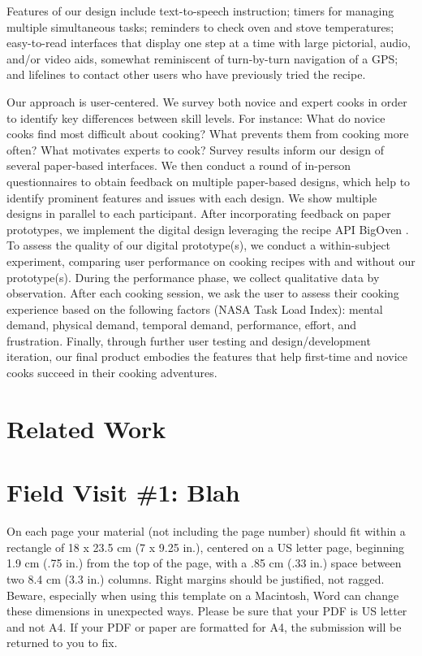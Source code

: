 \documentclass{sigchi}
\begin{document}
Features of our design include text-to-speech instruction; timers for managing multiple simultaneous tasks; reminders to check oven and stove temperatures; easy-to-read interfaces that display one step at a time with large pictorial, audio, and/or video aids, somewhat reminiscent of turn-by-turn navigation of a GPS; and lifelines to contact other users who have previously tried the recipe.

Our approach is user-centered. We survey both novice and expert cooks in order to identify key differences between skill levels. For instance: What do novice cooks find most difficult about cooking? What prevents them from cooking more often? What motivates experts to cook? Survey results inform our design of several paper-based interfaces. We then conduct a round of in-person questionnaires to obtain feedback on multiple paper-based designs, which help to identify prominent features and issues with each design. We show multiple designs in parallel to each participant. After incorporating feedback on paper prototypes, we implement the digital design leveraging the recipe API BigOven \cite{api_oven}. To assess the quality of our digital prototype(s), we conduct a within-subject experiment, comparing user performance on cooking recipes with and without our prototype(s). During the performance phase, we collect qualitative data by observation. After each cooking session, we ask the user to assess their cooking experience based on the following factors (NASA Task Load Index): mental demand, physical demand, temporal demand, performance, effort, and frustration. Finally, through further user testing and design/development iteration, our final product embodies the features that help first-time and novice cooks succeed in their cooking adventures.

\section{Related Work}

\section{Field Visit \#1: Blah}

On each page your material (not including the page number) should fit
within a rectangle of 18 x 23.5 cm (7 x 9.25 in.), centered on a US
letter page, beginning 1.9 cm (.75 in.) from the top of the page, with
a .85 cm (.33 in.) space between two 8.4 cm (3.3 in.) columns.  Right
margins should be justified, not ragged. Beware, especially when using
this template on a Macintosh, Word can change these dimensions in
unexpected ways. Please be sure that your PDF is US letter and not
A4. If your PDF or paper are formatted for A4, the submission will be
returned to you to fix.
\end{document}
